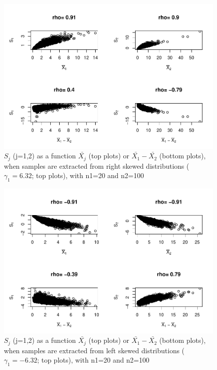 \documentclass[
  man]{apa6}
\begin{document}
\begin{figure}
\centering
\includegraphics{Correlations-between-the-sample-means-difference-and-standardizers-of-all-estimators,-and-implications-on-biases-and-variances-of-all-estimators_files/figure-latex/SDC3Rs-1.pdf}
\caption{\label{fig:SDC3Rs}\(S_j\) (j=1,2) as a function \(\bar{X_j}\) (top plots) or \(\bar{X_1}-\bar{X_2}\) (bottom plots), when samples are extracted from right skewed distributions (\(\gamma_1 = 6.32\); top plots), with n1=20 and n2=100}
\end{figure}

\begin{figure}
\centering
\includegraphics{Correlations-between-the-sample-means-difference-and-standardizers-of-all-estimators,-and-implications-on-biases-and-variances-of-all-estimators_files/figure-latex/SDC3Ls-1.pdf}
\caption{\label{fig:SDC3Ls}\(S_j\) (j=1,2) as a function \(\bar{X_j}\) (top plots) or \(\bar{X_1}-\bar{X_2}\) (bottom plots), when samples are extracted from left skewed distributions (\(\gamma_1 = -6.32\); top plots), with n1=20 and n2=100}
\end{figure}
\end{document}
